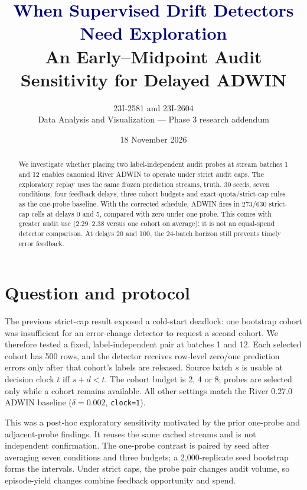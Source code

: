 \documentclass[10pt]{article}
\title{\textcolor{navy}{When Supervised Drift Detectors Need Exploration}\\[3pt]
\large An Early--Midpoint Audit Sensitivity for Delayed ADWIN}
\author{23I-2581 and 23I-2604\\Data Analysis and Visualization --- Phase 3 research addendum}
\date{18 November 2026}
\begin{document}
\maketitle
\begin{abstract}
We investigate whether placing two label-independent audit probes at stream batches 1 and 12 enables canonical River ADWIN to operate under strict audit caps. The exploratory replay uses the same frozen prediction streams, truth, 30 seeds, seven conditions, four feedback delays, three cohort budgets and exact-quota/strict-cap rules as the one-probe baseline. With the corrected schedule, ADWIN fires in 273/630 strict-cap cells at delays 0 and 5, compared with zero under one probe. This comes with greater audit use (2.29--2.38 versus one cohort on average); it is not an equal-spend detector comparison. At delays 20 and 100, the 24-batch horizon still prevents timely error feedback.\end{abstract}
\section{Question and protocol}
The previous strict-cap result exposed a cold-start deadlock: one bootstrap cohort was insufficient for an error-change detector to request a second cohort. We therefore tested a fixed, label-independent pair at batches 1 and 12. Each selected cohort has 500 rows, and the detector receives row-level zero/one prediction errors only after that cohort's labels are released. Source batch $s$ is usable at decision clock $t$ iff $s+d<t$. The cohort budget is 2, 4 or 8; probes are selected only while a cohort remains available. All other settings match the River 0.27.0 ADWIN baseline ($\delta=0.002$, \texttt{clock=1}).

This was a post-hoc exploratory sensitivity motivated by the prior one-probe and adjacent-probe findings. It reuses the same cached streams and is not independent confirmation. The one-probe contrast is paired by seed after averaging seven conditions and three budgets; a 2,000-replicate seed bootstrap forms the intervals. Under strict caps, the probe pair changes audit volume, so episode-yield changes combine feedback opportunity and spend.
\end{document}
